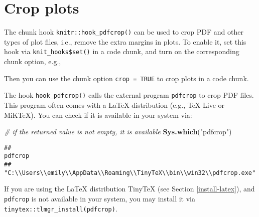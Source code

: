 \documentclass[
  11pt,
]{krantz}
\newenvironment{Shaded}{\begin{snugshade}}{\end{snugshade}}
\newcommand{\CommentTok}[1]{\textcolor[rgb]{0.37,0.37,0.37}{\textit{#1}}}
\newcommand{\DataTypeTok}[1]{\textcolor[rgb]{0.27,0.27,0.27}{#1}}
\newcommand{\KeywordTok}[1]{\textcolor[rgb]{0.27,0.27,0.27}{\textbf{#1}}}
\newcommand{\NormalTok}[1]{#1}
\newcommand{\OperatorTok}[1]{\textcolor[rgb]{0.43,0.43,0.43}{\textbf{#1}}}
\newcommand{\StringTok}[1]{\textcolor[rgb]{0.5,0.5,0.5}{#1}}
\begin{document}
\hypertarget{crop-plot}{%
\section{Crop plots}\label{crop-plot}}

The chunk hook \texttt{knitr::hook\_pdfcrop()} can be used to crop PDF and other types of plot files, i.e., remove the extra margins in plots. To enable it, set this hook via \texttt{knit\_hooks\$set()} in a code chunk, and turn on the corresponding chunk option, e.g.,

\begin{Shaded}
\end{Shaded}

Then you can use the chunk option \texttt{crop\ =\ TRUE} to crop plots in a code chunk.

The hook \texttt{hook\_pdfcrop()} calls the external program \texttt{pdfcrop} to crop PDF files. This program often comes with a LaTeX distribution (e.g., TeX Live or MiKTeX). You can check if it is available in your system via:

\begin{Shaded}
\begin{Highlighting}[]
\CommentTok{# if the returned value is not empty, it is available}
\KeywordTok{Sys.which}\NormalTok{(}\StringTok{"pdfcrop"}\NormalTok{)}
\end{Highlighting}
\end{Shaded}

\begin{verbatim}
##                                                                pdfcrop 
## "C:\\Users\\emily\\AppData\\Roaming\\TinyTeX\\bin\\win32\\pdfcrop.exe"
\end{verbatim}

If you are using the LaTeX distribution TinyTeX (see Section \ref{install-latex}), and \texttt{pdfcrop} is not available in your system, you may install it via \texttt{tinytex::tlmgr\_install(\textquotesingle{}pdfcrop\textquotesingle{})}.
\end{document}
